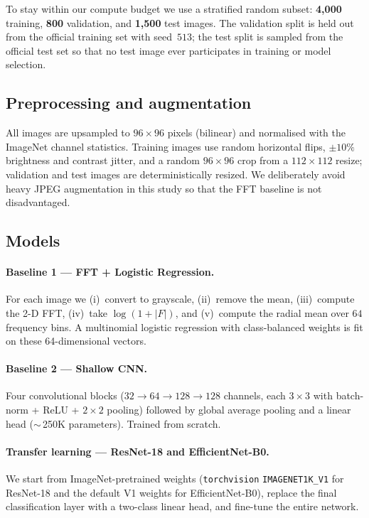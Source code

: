 \documentclass{article}
\begin{document}
To stay within our compute budget we use a stratified random subset:
\textbf{4{,}000} training, \textbf{800} validation, and \textbf{1{,}500}
test images. The validation split is held out from the official training
set with seed~$513$; the test split is sampled from the official test
set so that no test image ever participates in training or model
selection.

\subsection{Preprocessing and augmentation}

All images are upsampled to $96\times96$ pixels (bilinear) and
normalised with the ImageNet channel statistics. Training images use
random horizontal flips, $\pm10\%$ brightness and contrast jitter, and
a random $96\times96$ crop from a $112\times112$ resize; validation and
test images are deterministically resized. We deliberately avoid heavy
JPEG augmentation in this study so that the FFT baseline is not
disadvantaged.

\subsection{Models}

\paragraph{Baseline 1 --- FFT + Logistic Regression.}
For each image we (i)~convert to grayscale, (ii)~remove the mean,
(iii)~compute the 2-D FFT, (iv)~take $\log(1+|F|)$, and (v)~compute the
radial mean over $64$ frequency bins. A multinomial logistic
regression with class-balanced weights is fit on these 64-dimensional
vectors.

\paragraph{Baseline 2 --- Shallow CNN.}
Four convolutional blocks ($32\!\to\!64\!\to\!128\!\to\!128$ channels,
each $3\times3$ with batch-norm + ReLU + $2\times2$ pooling) followed
by global average pooling and a linear head ($\sim$\,250K parameters).
Trained from scratch.

\paragraph{Transfer learning --- ResNet-18 and EfficientNet-B0.}
We start from ImageNet-pretrained weights (\texttt{torchvision}
\texttt{IMAGENET1K\_V1} for ResNet-18 and the default V1 weights for
EfficientNet-B0), replace the final classification layer with a
two-class linear head, and fine-tune the entire network.
\end{document}
